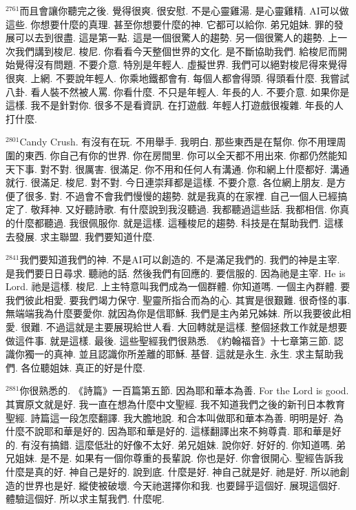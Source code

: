 \documentclass{book}
\begin{document}
$^{2761}$而且會讓你聽完之後.
覺得很爽.
很安慰.
不是心靈雞湯.
是心靈雞精.
AI可以做這些.
你想要什麼的真理.
甚至你想要什麼的神.
它都可以給你.
弟兄姐妹.
罪的發展可以去到很盡.
這是第一點.
這是一個很驚人的趨勢.
另一個很驚人的趨勢.
上一次我們講到梭尼.
梭尼.
你看看今天整個世界的文化.
是不斷協助我們.
給梭尼而開始覺得沒有問題.
不要介意.
特別是年輕人.
虛擬世界.
我們可以絕對梭尼得來覺得很爽.
上網.
不要說年輕人.
你乘地鐵都會有.
每個人都會得頭.
得頭看什麼.
我嘗試八卦.
看人裝不然被人罵.
你看什麼.
不只是年輕人.
年長的人.
不要介意.
如果你是這樣.
我不是針對你.
很多不是看資訊.
在打遊戲.
年輕人打遊戲很複雜.
年長的人打什麼.

$^{2801}$Candy Crush.
有沒有在玩.
不用舉手.
我明白.
那些東西是在幫你.
你不用理周圍的東西.
你自己有你的世界.
你在房間里.
你可以全天都不用出來.
你都仍然能知天下事.
對不對.
很厲害.
很滿足.
你不用和任何人有溝通.
你和網上什麼都好.
溝通就行.
很滿足.
梭尼.
對不對.
今日連崇拜都是這樣.
不要介意.
各位網上朋友.
是方便了很多.
對.
不過會不會我們慢慢的趨勢.
就是我真的在家裡.
自己一個人已經搞定了.
敬拜神.
又好聽詩歌.
有什麼說到我沒聽過.
我都聽過這些話.
我都相信.
你真的什麼都聽過.
我很佩服你.
就是這樣.
這種梭尼的趨勢.
科技是在幫助我們.
這樣去發展.
求主聯盟.
我們要知道什麼.

$^{2841}$我們要知道我們的神.
不是AI可以創造的.
不是滿足我們的.
我們的神是主宰.
是我們要日日尋求.
聽祂的話.
然後我們有回應的.
要信服的.
因為祂是主宰.
He is Lord.
祂是這樣.
梭尼.
上主特意叫我們成為一個群體.
你知道嗎.
一個主內群體.
要我們彼此相愛.
要我們竭力保守.
聖靈所指合而為的心.
其實是很艱難.
很奇怪的事.
無端端我為什麼要愛你.
就因為你是信耶穌.
我們是主內弟兄姊妹.
所以我要彼此相愛.
很難.
不過這就是主要展現給世人看.
大回轉就是這樣.
整個拯救工作就是想要做這件事.
就是這樣.
最後.
這些聖經我們很熟悉.
《約翰福音》十七章第三節.
認識你獨一的真神.
並且認識你所差離的耶穌.
基督.
這就是永生.
永生.
求主幫助我們.
各位聽姐妹.
真正的好是什麼.

$^{2881}$你很熟悉的.
《詩篇》一百篇第五節.
因為耶和華本為善.
For the Lord is good.
其實原文就是好.
我一直在想為什麼中文聖經.
我不知道我們之後的新刊日本教育聖經.
詩篇這一段怎麼翻譯.
我大膽地說.
和合本叫做耶和華本為善.
明明是好.
為什麼不說耶和華是好的.
因為耶和華是好的.
這樣翻譯出來不夠尊貴.
耶和華是好的.
有沒有搞錯.
這麼低壯的好像不太好.
弟兄姐妹.
說你好.
好好的.
你知道嗎.
弟兄姐妹.
是不是.
如果有一個你尊重的長輩說.
你也是好.
你會很開心.
聖經告訴我什麼是真的好.
神自己是好的.
說到底.
什麼是好.
神自己就是好.
祂是好.
所以祂創造的世界也是好.
縱使被破壞.
今天祂選擇你和我.
也要歸乎這個好.
展現這個好.
體驗這個好.
所以求主幫我們.
什麼呢.
\end{document}
